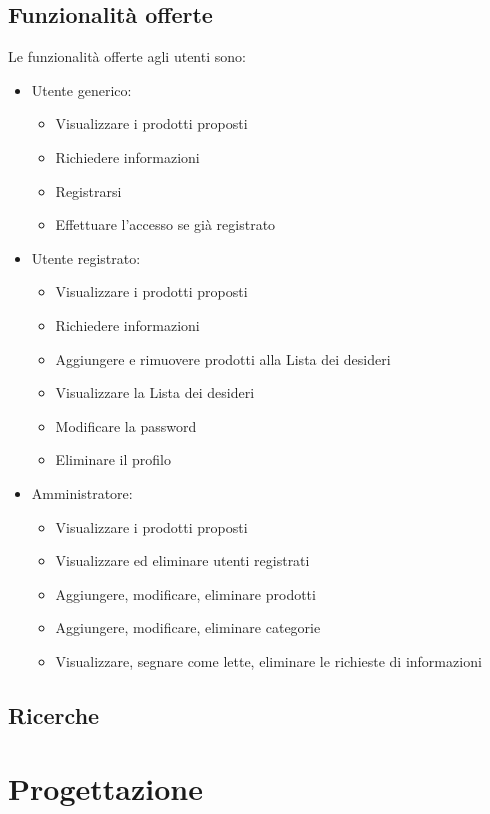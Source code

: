 \documentclass[a4paper, 11pt]{article}
\begin{document}
\subsection{Funzionalità offerte}
Le funzionalità offerte agli utenti sono:
\begin{itemize}
\item Utente generico:
	\begin{itemize}
	\item Visualizzare i prodotti proposti
	\item Richiedere informazioni
	\item Registrarsi
	\item Effettuare l'accesso se già registrato
	\end{itemize}
	
\item Utente registrato:
	\begin{itemize}
	\item Visualizzare i prodotti proposti
	\item Richiedere informazioni
	\item Aggiungere e rimuovere prodotti alla Lista dei desideri
	\item Visualizzare la Lista dei desideri
	\item Modificare la password
	\item Eliminare il profilo
	\end{itemize}

\pagebreak
\item Amministratore:
	\begin{itemize}
	\item Visualizzare i prodotti proposti
	\item Visualizzare ed eliminare utenti registrati
	\item Aggiungere, modificare, eliminare prodotti
	\item Aggiungere, modificare, eliminare categorie
	\item Visualizzare, segnare come lette, eliminare le richieste di informazioni
	\end{itemize}
	
\end{itemize}


\subsection{Ricerche}

\section{Progettazione}
\end{document}
